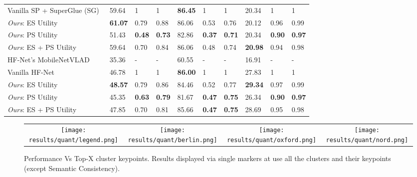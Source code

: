 \documentclass[letterpaper, 10 pt, conference]{ieeeconf}  \fi
\begin{document}
\begin{table*}
{\begin{tabular}{llllllllll}
Vanilla SP + SuperGlue (SG)~\cite{sarlin2020superglue} & 59.64          & 1             & 1             & \textbf{86.45}          & 1             & 1             & 20.34          & 1             & 1             \\
\textit{Ours}: ES Utility         & \textbf{61.07} & 0.79          & 0.88          & 86.06 & 0.53          & 0.76          & 20.12 & 0.96          & 0.99          \\
\textit{Ours}: PS Utility        & 51.43          & \textbf{0.48} & \textbf{0.73} & 82.86          & \textbf{0.37} & \textbf{0.71} & 20.34          & \textbf{0.90}          & \textbf{0.97}          \\
\textit{Ours}: ES + PS Utility    & 59.64          & 0.70          & 0.84          & 86.06 & 0.48          & 0.74          & \textbf{20.98} & 0.94         & 0.98          \\

\midrule

HF-Net's MobileNetVLAD~\cite{sarlin2019coarse}                 & 35.36          & -             & -             & 60.55          & -             & -             & 16.91           & -             & -             \\
Vanilla HF-Net  & 46.78          & 1             & 1             & \textbf{86.00}          & 1             & 1             & 27.83          & 1             & 1             \\
\textit{Ours}: ES Utility         & \textbf{48.57} & 0.79          & 0.86          & 84.46 & 0.52          & 0.77          & \textbf{29.34} & 0.97          & 0.99          \\
\textit{Ours}: PS Utility        & 45.35          & \textbf{0.63} & \textbf{0.79} & 81.67          & \textbf{0.47} & \textbf{0.75} & 26.34          & \textbf{0.90}          & \textbf{0.97}          \\
\textit{Ours}: ES + PS Utility    & 47.85          & 0.70          & 0.81          & 85.66 & \textbf{0.47}          & \textbf{0.75}          & 28.69 & 0.95          & 0.98          \\

\bottomrule
\end{tabular}
}
\label{tab:mainResult}
\end{table*}


\begin{figure*}
\centering
\begin{tabular}{cccc}
\texttt{[image: results/quant/legend.png]}
&
\texttt{[image: results/quant/berlin.png]}
& 
\texttt{[image: results/quant/oxford.png]}
&
\texttt{[image: results/quant/nord.png]} \\
\end{tabular}
\caption{Performance Vs Top-X cluster keypoints. Results displayed via single markers at  use all the clusters and their keypoints (except Semantic Consistency).}
\label{fig:mainResult}
\end{figure*}
\end{document}
